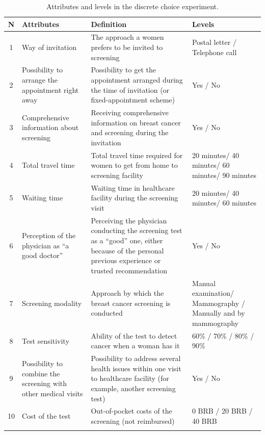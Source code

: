 \documentclass{article}
\renewcommand{\arraystretch}{1.12}
\begin{document}
\begin{table}[htbp]
\centering
\caption{Attributes and levels in the discrete choice experiment.}
\label{tab:BELA}
\renewcommand{\arraystretch}{1.3} %
\begin{tabular}{|c|p{4cm}|p{5cm}|p{3.5cm}|}
\hline
\textbf{N} & \textbf{Attributes} & \textbf{Definition} & \textbf{Levels} \\ \hline
1 & Way of invitation & The approach a women prefers to be invited to screening & Postal letter / Telephone call \\ \hline
2 & Possibility to arrange the appointment right away & Possibility to get the appointment arranged during the time of invitation (or fixed-appointment scheme) & Yes / No \\ \hline
3 & Comprehensive information about screening & Receiving comprehensive information on breast cancer and screening during the invitation & Yes / No \\ \hline
4 & Total travel time & Total travel time required for women to get from home to screening facility & 20 minutes/ 40 minutes/ 60 minutes/ 90 minutes \\ \hline
5 & Waiting time & Waiting time in healthcare facility during the screening visit & 20 minutes/ 40 minutes/ 60 minutes \\ \hline
6 & Perception of the physician as ``a good doctor'' & Perceiving the physician conducting the screening test as a ``good'' one, either because of the personal previous experience or trusted recommendation & Yes / No \\ \hline
7 & Screening modality & Approach by which the breast cancer screening is conducted & Manual examination/ Mammography / Manually and by mammography \\ \hline
8 & Test sensitivity & Ability of the test to detect cancer when a woman has it & 60\% / 70\% / 80\% / 90\% \\ \hline
9 & Possibility to combine the screening with other medical visits & Possibility to address several health issues within one visit to healthcare facility (for example, another screening test) & Yes / No \\ \hline
10 & Cost of the test & Out-of-pocket costs of the screening (not reimbursed) & 0 BRB / 20 BRB / 40 BRB \\ \hline
\multicolumn{4}{l}{}
\end{tabular}
\end{table}
\end{document}
